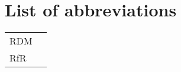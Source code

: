 \section*{List of abbreviations}
\label{s:gloss}
\begin{table}[h!]
\begin{tabular}{ll}
 RDM &  \\
 RfR &  \\
\end{tabular}
\end{table}